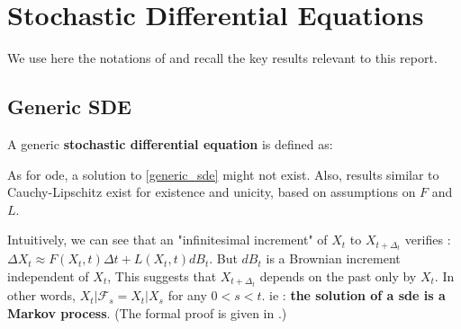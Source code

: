 \chapter{Stochastic Differential Equations}\label{sec:SDE_results}

We use here the notations of \cite{sarkka_applied_2019} and recall the key results relevant to this report.

\section{Generic SDE}

A generic \textbf{stochastic differential equation} is defined as:


As for \gls{ode}, a solution to \ref{generic_sde} might not exist. Also, results similar to Cauchy-Lipschitz 
exist for existence and unicity, based on assumptions on $F$ and $L$. 

Intuitively, we can see that an "infinitesimal increment" of $X_t$ to $X_{t+\Delta_t}$ verifies :
$\Delta {X_t} \approx F(X_t, t) \Delta t + L(X_t,t) dB_t$. But $dB_t$ is a Brownian increment independent of $X_t$,
This suggests that $X_{t+ \Delta_t}$ depends on the past only by $X_t$. In other words, $X_t \vert \mathcal{F}_s = X_t \vert X_s$ 
for any $0 < s < t$. ie : \textbf{the solution of a \gls{sde} is a Markov process}. (The formal proof is given in \cite{mouvement-brownien-calcul-ito}.)

